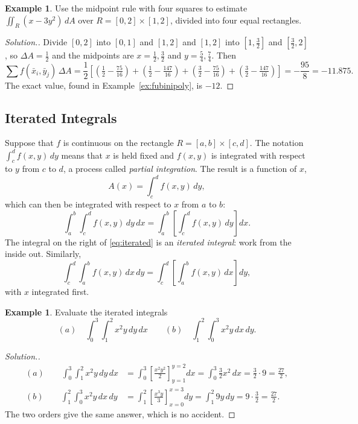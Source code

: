 \documentclass[11pt,a4paper]{article}
\theoremstyle{definition}
\newtheorem{exa}[thm]{Example}
\newenvironment{solution}
  {\renewcommand{\qedsymbol}{}\begin{proof}[\textit{Solution}.]}
  {\end{proof}}
\begin{document}
\begin{exa}
\label{ex:midpoint}
Use the midpoint rule with four squares to estimate
$\iint_R (x - 3y^2)\,dA$ over $R = [0,2]\times[1,2]$, divided into four equal
rectangles.
\end{exa}

\begin{solution}
Divide $[0,2]$ into $[0,1]$ and $[1,2]$ and $[1,2]$ into $[1,\frac32]$ and
$[\frac32,2]$, so $\Delta A = \frac12$ and the midpoints are $x = \frac12,
\frac32$ and $y = \frac54, \frac74$. Then
\[\sum f(\bar x_i,\bar y_j)\,\Delta A = \frac12\left[\left(\tfrac12 -
\tfrac{75}{16}\right) + \left(\tfrac12 - \tfrac{147}{16}\right) + \left(\tfrac32 -
\tfrac{75}{16}\right) + \left(\tfrac32 - \tfrac{147}{16}\right)\right] =
-\frac{95}{8} = -11.875 .\]
The exact value, found in Example~\ref{ex:fubinipoly}, is $-12$.
\end{solution}

{\color[wave]{485}\subsection{Iterated Integrals}}

Suppose that $f$ is continuous on the rectangle $R = [a,b]\times [c,d]$. The
notation $\int^d_c f(x,y)\,dy$ means that $x$ is held fixed and $f(x,y)$ is
integrated with respect to $y$ from $c$ to $d$, a process called \emph{partial
integration}. The result is a function of $x$,
\[A(x) = \int^d_c f(x,y)\, dy ,\]
which can then be integrated with respect to $x$ from $a$ to $b$:
\begin{equation}
\int^b_a\int^d_c f(x,y)\,dy\,dx = \int^b_a\left[ \int^d_c f(x,y)\,dy\right] dx .
\label{eq:iterated}
\end{equation}
The integral on the right of \eqref{eq:iterated} is an \emph{iterated
integral}: work from the inside out. Similarly,
\[\int^d_c\int^b_a f(x,y)\,dx\,dy = \int^d_c\left[ \int^b_a f(x,y)\,dx\right] dy
,\]
with $x$ integrated first.

\begin{exa}
\label{ex:iterated}
Evaluate the iterated integrals
\[(a)\quad  \int^3_0\int^2_1 x^2y\,dy\,dx\qquad  (b)\quad  \int^2_1\int^3_0
x^2y\,dx\,dy .\]
\end{exa}

\begin{solution}
\begin{align*}
(a)\qquad \int^3_0\int^2_1 x^2y\,dy\,dx & = \int^3_0\left[ \frac{x^2y^2}{2}
\right]_{y=1}^{y=2} dx = \int^3_0\frac{3}{2}x^2\,dx = \frac{3}{2}\cdot 9 =
\frac{27}{2},\\[1ex]
(b)\qquad \int^2_1\int^3_0 x^2y\,dx\,dy & = \int^2_1\left[\frac{x^3y}{3}
\right]_{x=0}^{x=3} dy = \int^2_1 9y\,dy = 9\cdot\frac32 = \frac{27}{2} .
\end{align*}
The two orders give the same answer, which is no accident.
\end{solution}
\end{document}
